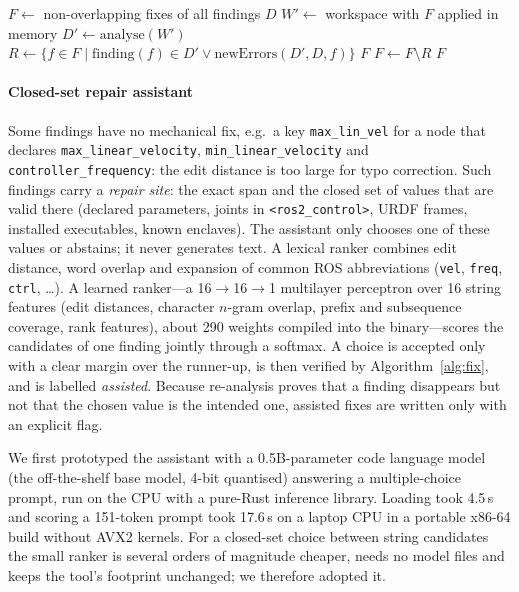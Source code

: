 ﻿\documentclass[conference]{IEEEtran}
\newcommand{\code}[1]{\texttt{#1}}
\begin{document}
\begin{algorithm}[t]
\caption{Fix verification}
\label{alg:fix}
\footnotesize
\begin{algorithmic}[1]
\State $F \gets$ non-overlapping fixes of all findings $D$
  \State $W' \gets$ workspace with $F$ applied in memory
  \State $D' \gets \mathrm{analyse}(W')$
  \State $R \gets \{f\in F \mid \mathrm{finding}(f)\in D' \lor \mathrm{newErrors}(D', D, f)\}$
   \Return $F$ \EndIf
  \State $F \gets F \setminus R$
\EndFor
\State \Return $F$
\end{algorithmic}
\end{algorithm}

\paragraph{Closed-set repair assistant}
Some findings have no mechanical fix, e.g.\ a key \code{max\_lin\_vel} for a node that declares
\code{max\_linear\_velocity}, \code{min\_linear\_velocity} and \code{controller\_frequency}: the
edit distance is too large for typo correction. Such findings carry a \emph{repair site}: the
exact span and the closed set of values that are valid there (declared parameters, joints in
\code{<ros2\_control>}, URDF frames, installed executables, known enclaves). The assistant only
chooses one of these values or abstains; it never generates text. A lexical ranker combines edit
distance, word overlap and expansion of common ROS abbreviations (\code{vel}, \code{freq},
\code{ctrl}, \dots). A learned ranker---a 16$\to$16$\to$1 multilayer perceptron over 16 string
features (edit distances, character $n$-gram overlap, prefix and subsequence coverage, rank
features), about 290 weights compiled into the binary---scores the candidates of one finding
jointly through a softmax. A choice is accepted only with a clear margin over the runner-up, is
then verified by Algorithm~\ref{alg:fix}, and is labelled \emph{assisted}. Because
re-analysis proves that a finding disappears but not that the chosen value is the intended one,
assisted fixes are written only with an explicit flag.

We first prototyped the assistant with a 0.5B-parameter code language model (the
off-the-shelf base model, 4-bit quantised) answering a multiple-choice prompt, run on the CPU
with a pure-Rust inference library. Loading took 4.5\,s and scoring a 151-token prompt took
17.6\,s on a laptop CPU in a portable x86-64 build without AVX2 kernels. For a
closed-set choice between string candidates the small ranker is several orders of magnitude
cheaper, needs no model files and keeps the tool's footprint unchanged; we therefore adopted it.
\end{document}
